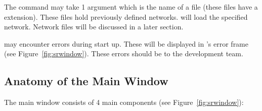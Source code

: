 The  command may take 1 argument
which is the name of a \sr{}   file (these
files have a  extension).  These files hold previously
defined \sr{} networks.  \sr{} will load the specified network.  Network
files will be discussed in a later section.

\sr{} may encounter errors during start up.  These will be displayed in
\sr{}'s error frame (see Figure~\ref{fig:srwindow}).  These errors
should be  to the \sr{} development
team.  

\subsection{Anatomy of the Main Window}
\label{sec:windowanatomy}

The \sr{} main window consists of 4 main components (see
Figure~\ref{fig:srwindow}): 

